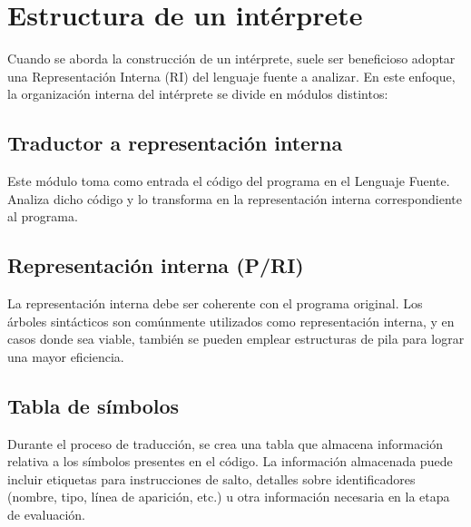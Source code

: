 \section{Estructura de un intérprete}
Cuando se aborda la construcción de un intérprete, suele ser beneficioso adoptar una Representación Interna (RI) del lenguaje fuente a analizar. En este enfoque, la organización interna del intérprete se divide en módulos distintos:

\subsection{Traductor a representación interna}
Este módulo toma como entrada el código del programa en el Lenguaje Fuente. Analiza dicho código y lo transforma en la representación interna correspondiente al programa. \parencite{LabraGayo2003}

\subsection{Representación interna (P/RI)}
La representación interna debe ser coherente con el programa original. Los árboles sintácticos son comúnmente utilizados como representación interna, y en casos donde sea viable, también se pueden emplear estructuras de pila para lograr una mayor eficiencia. \parencite{LabraGayo2003}

\subsection{Tabla de símbolos}
Durante el proceso de traducción, se crea una tabla que almacena información relativa a los símbolos presentes en el código. La información almacenada puede incluir etiquetas para instrucciones de salto, detalles sobre identificadores (nombre, tipo, línea de aparición, etc.) u otra información necesaria en la etapa de evaluación. \parencite{LabraGayo2003}


